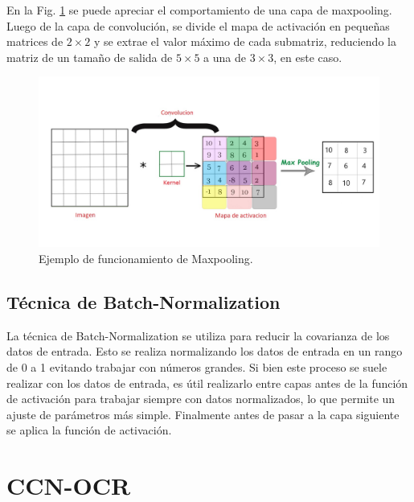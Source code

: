 En la Fig. \ref{fig:ejemplo-mp} se puede apreciar el comportamiento de una capa de maxpooling. Luego de la capa de convolución, se divide el mapa de activación
en pequeñas matrices de $2 \times 2$ y se extrae el valor máximo de cada submatriz, reduciendo la matriz de un tamaño de salida de $5 \times 5$ a una de $3 \times 3$, en este caso.
\begin{figure}[bth]
    \centering
    \includegraphics[width=1\textwidth]{imgs/ej-maxpooling.jpg}
    \caption{Ejemplo de funcionamiento de Maxpooling.}
    \label{fig:ejemplo-mp}
\end{figure}

\subsection{Técnica de Batch-Normalization}

La técnica de Batch-Normalization se utiliza para reducir la covarianza de los datos de entrada. Esto se realiza normalizando los datos de entrada en un rango de 0 a 1 evitando trabajar con números grandes. Si bien este proceso se suele realizar con los datos de entrada, es útil realizarlo entre capas antes de la función de activación para trabajar siempre con datos normalizados, lo que permite un ajuste de parámetros más simple. Finalmente antes de pasar a la capa siguiente se aplica la función de activación.

\section{CCN-OCR}

